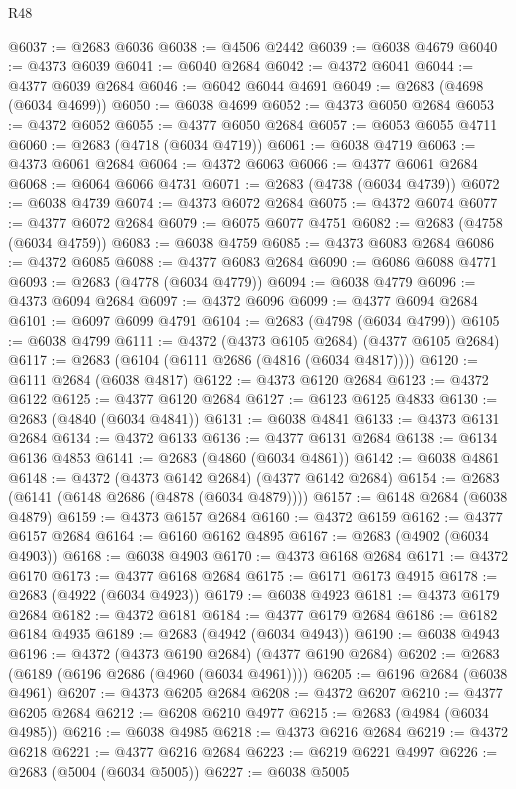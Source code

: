 \begin{lexlean}{R48}
\begin{coremodule}
@6037 := @2683 @6036
@6038 := @4506 @2442
@6039 := @6038 @4679
@6040 := @4373 @6039
@6041 := @6040 @2684
@6042 := @4372 @6041
@6044 := @4377 @6039 @2684
@6046 := @6042 @6044 @4691
@6049 := @2683 (@4698 (@6034 @4699))
@6050 := @6038 @4699
@6052 := @4373 @6050 @2684
@6053 := @4372 @6052
@6055 := @4377 @6050 @2684
@6057 := @6053 @6055 @4711
@6060 := @2683 (@4718 (@6034 @4719))
@6061 := @6038 @4719
@6063 := @4373 @6061 @2684
@6064 := @4372 @6063
@6066 := @4377 @6061 @2684
@6068 := @6064 @6066 @4731
@6071 := @2683 (@4738 (@6034 @4739))
@6072 := @6038 @4739
@6074 := @4373 @6072 @2684
@6075 := @4372 @6074
@6077 := @4377 @6072 @2684
@6079 := @6075 @6077 @4751
@6082 := @2683 (@4758 (@6034 @4759))
@6083 := @6038 @4759
@6085 := @4373 @6083 @2684
@6086 := @4372 @6085
@6088 := @4377 @6083 @2684
@6090 := @6086 @6088 @4771
@6093 := @2683 (@4778 (@6034 @4779))
@6094 := @6038 @4779
@6096 := @4373 @6094 @2684
@6097 := @4372 @6096
@6099 := @4377 @6094 @2684
@6101 := @6097 @6099 @4791
@6104 := @2683 (@4798 (@6034 @4799))
@6105 := @6038 @4799
@6111 := @4372 (@4373 @6105 @2684) (@4377 @6105 @2684)
@6117 := @2683 (@6104 (@6111 @2686 (@4816 (@6034 @4817))))
@6120 := @6111 @2684 (@6038 @4817)
@6122 := @4373 @6120 @2684
@6123 := @4372 @6122
@6125 := @4377 @6120 @2684
@6127 := @6123 @6125 @4833
@6130 := @2683 (@4840 (@6034 @4841))
@6131 := @6038 @4841
@6133 := @4373 @6131 @2684
@6134 := @4372 @6133
@6136 := @4377 @6131 @2684
@6138 := @6134 @6136 @4853
@6141 := @2683 (@4860 (@6034 @4861))
@6142 := @6038 @4861
@6148 := @4372 (@4373 @6142 @2684) (@4377 @6142 @2684)
@6154 := @2683 (@6141 (@6148 @2686 (@4878 (@6034 @4879))))
@6157 := @6148 @2684 (@6038 @4879)
@6159 := @4373 @6157 @2684
@6160 := @4372 @6159
@6162 := @4377 @6157 @2684
@6164 := @6160 @6162 @4895
@6167 := @2683 (@4902 (@6034 @4903))
@6168 := @6038 @4903
@6170 := @4373 @6168 @2684
@6171 := @4372 @6170
@6173 := @4377 @6168 @2684
@6175 := @6171 @6173 @4915
@6178 := @2683 (@4922 (@6034 @4923))
@6179 := @6038 @4923
@6181 := @4373 @6179 @2684
@6182 := @4372 @6181
@6184 := @4377 @6179 @2684
@6186 := @6182 @6184 @4935
@6189 := @2683 (@4942 (@6034 @4943))
@6190 := @6038 @4943
@6196 := @4372 (@4373 @6190 @2684) (@4377 @6190 @2684)
@6202 := @2683 (@6189 (@6196 @2686 (@4960 (@6034 @4961))))
@6205 := @6196 @2684 (@6038 @4961)
@6207 := @4373 @6205 @2684
@6208 := @4372 @6207
@6210 := @4377 @6205 @2684
@6212 := @6208 @6210 @4977
@6215 := @2683 (@4984 (@6034 @4985))
@6216 := @6038 @4985
@6218 := @4373 @6216 @2684
@6219 := @4372 @6218
@6221 := @4377 @6216 @2684
@6223 := @6219 @6221 @4997
@6226 := @2683 (@5004 (@6034 @5005))
@6227 := @6038 @5005

\end{coremodule}
\end{lexlean}
